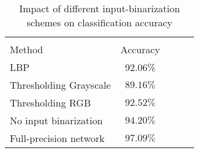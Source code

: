 \documentclass[conference,compsoc]{IEEEtran}
\newcommand{\jani}[1]{\textcolor{red}{\textbf{[Jani: #1]}}}
\newcommand{\response}[1]{\textcolor{darkgreen}{#1}}
\begin{document}
\begin{table} 
\caption{Impact of different input-binarization schemes on classification accuracy}
\centering 
\begin{tabular}{l c c c c} 
& \multicolumn{1}{c}{} \\ 

Method & Accuracy \\ %
\midrule %
LBP	&  {92.06\%}\\ 
Thresholding  Grayscale& ${89.16\%}$ \\
Thresholding RGB &  ${92.52\%}$ \\
No input binarization    &${94.20\%}$ \\ 
Full-precision network    &${97.09\%}$ \\ 
\midrule %
\bottomrule %

\end{tabular}
\label{tblAccuracy} %
\end{table}





\end{document}
